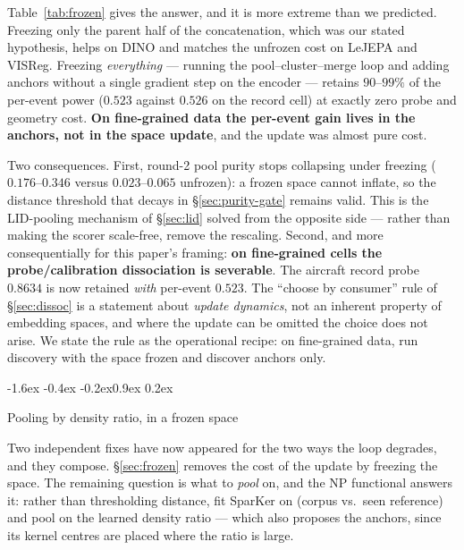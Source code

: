 \documentclass{article}
\makeatletter
\renewcommand\subsection{\@startsection{subsection}{2}{\z@}%
  {-1.6ex \@plus -0.4ex \@minus -0.2ex}{0.9ex \@plus 0.2ex}%
  {\normalsize\bf\raggedright}}
\makeatother
\begin{document}
Table~\ref{tab:frozen} gives the answer, and it is more extreme than we
predicted. Freezing only the parent half of the concatenation, which was our
stated hypothesis, helps on DINO and matches the unfrozen cost on LeJEPA and
VISReg. Freezing \emph{everything} --- running the pool--cluster--merge loop and
adding anchors without a single gradient step on the encoder --- retains
$90$--$99\%$ of the per-event power ($0.523$ against $0.526$ on the record cell)
at exactly zero probe and geometry cost. \textbf{On fine-grained data the
per-event gain lives in the anchors, not in the space update}, and the update was
almost pure cost.

Two consequences. First, round-2 pool purity stops collapsing under freezing
($0.176$--$0.346$ versus $0.023$--$0.065$ unfrozen): a frozen space cannot
inflate, so the distance threshold that decays in \S\ref{sec:purity-gate}
remains valid. This is the LID-pooling mechanism of \S\ref{sec:lid} solved from
the opposite side --- rather than making the scorer scale-free, remove the
rescaling. Second, and more consequentially for this paper's framing:
\textbf{on fine-grained cells the probe/calibration dissociation is severable}.
The aircraft record probe $0.8634$ is now retained \emph{with} per-event
$0.523$. The ``choose by consumer'' rule of \S\ref{sec:dissoc} is a statement
about \emph{update dynamics}, not an inherent property of embedding spaces, and
where the update can be omitted the choice does not arise. We state the rule as
the operational recipe: on fine-grained data, run discovery with the space
frozen and discover anchors only.

\subsection{Pooling by density ratio, in a frozen space}
\label{sec:spk-pool}

Two independent fixes have now appeared for the two ways the loop degrades, and
they compose. \S\ref{sec:frozen} removes the cost of the update by freezing the
space. The remaining question is what to \emph{pool} on, and the NP functional
answers it: rather than thresholding distance, fit SparKer on
(corpus vs.\ seen reference) and pool on the learned density ratio --- which
also proposes the anchors, since its kernel centres are placed where the ratio
is large.
\end{document}
